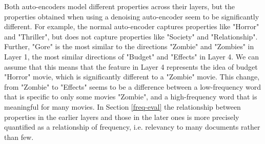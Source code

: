 Both auto-encoders model different properties across their layers, but the properties obtained when using a denoising auto-encoder seem to be significantly different. For example, the normal auto-encoder captures properties like "Horror" and "Thriller", but does not capture properties like "Society" and "Relationship". Further, "Gore"  is the  most similar to the directions "Zombie" and "Zombies" in Layer 1, the most similar directions of "Budget" and "Effects" in Layer 4. We can assume that this means that the feature in Layer 4 represents the  idea of budget "Horror" movie, which is significantly different to a "Zombie" movie. This change, from "Zombie" to "Effects" seems to be a difference between a low-frequency word that is specific to only some movies "Zombie", and a high-frequency word that is meaningful for many movies. In Section \ref{freq-eval} the relationship between properties in the earlier layers and those in the later ones is more precisely quantified as a relationship of frequency, i.e. relevancy to many documents rather than few.


